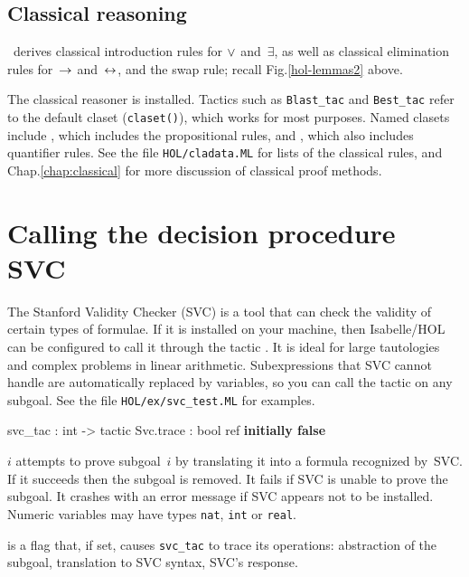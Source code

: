 \subsection{Classical reasoning}

\HOL\ derives classical introduction rules for $\vee$ and~$\exists$, as
well as classical elimination rules for~$\rightarrow$ and~$\leftrightarrow$, and the swap
rule; recall Fig.\ts\ref{hol-lemmas2} above.

The classical reasoner is installed.  Tactics such as \texttt{Blast_tac} and
{\tt Best_tac} refer to the default claset (\texttt{claset()}), which works
for most purposes.  Named clasets include , which
includes the propositional rules, and , which also
includes quantifier rules.  See the file \texttt{HOL/cladata.ML} for lists of
the classical rules,
and %
{Chap.\ts\ref{chap:classical}} for more discussion of classical proof methods.


\section{Calling the decision procedure SVC}\label{sec:HOL:SVC}


The Stanford Validity Checker (SVC) is a tool that can check the validity of
certain types of formulae.  If it is installed on your machine, then
Isabelle/HOL can be configured to call it through the tactic
.  It is ideal for large tautologies and complex problems in
linear arithmetic.  Subexpressions that SVC cannot handle are automatically
replaced by variables, so you can call the tactic on any subgoal.  See the
file \texttt{HOL/ex/svc_test.ML} for examples.
\begin{ttbox} 
svc_tac   : int -> tactic
Svc.trace : bool ref      \hfill{\bf initially false}
\end{ttbox}

\begin{ttdescription}
\item[\ttindexbold{svc_tac} $i$] attempts to prove subgoal~$i$ by translating
  it into a formula recognized by~SVC\@.  If it succeeds then the subgoal is
  removed.  It fails if SVC is unable to prove the subgoal.  It crashes with
  an error message if SVC appears not to be installed.  Numeric variables may
  have types \texttt{nat}, \texttt{int} or \texttt{real}.

\item[\ttindexbold{Svc.trace}] is a flag that, if set, causes \texttt{svc_tac}
  to trace its operations: abstraction of the subgoal, translation to SVC
  syntax, SVC's response.
\end{ttdescription}

